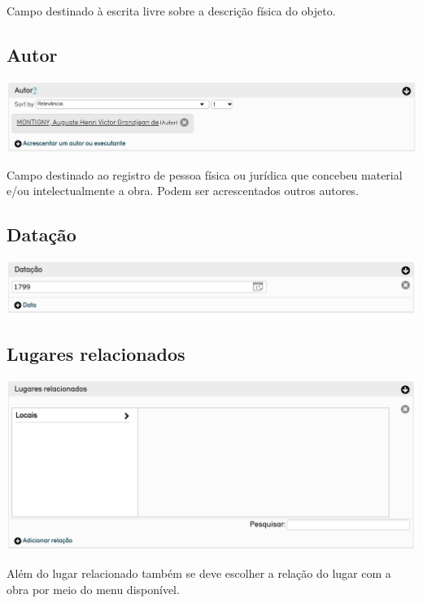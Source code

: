 Campo destinado à escrita livre sobre a descrição física do objeto.

\subsection{Autor}
\begin{flushleft}
	\includegraphics[width=\linewidth]{autor-01}
\end{flushleft}
Campo destinado ao registro de pessoa física ou jurídica que concebeu material e/ou intelectualmente a obra. Podem ser acrescentados outros autores.

\subsection{Datação}
\begin{flushleft}
	\includegraphics[width=\linewidth]{elemento-03}
\end{flushleft}

\subsection{Lugares relacionados}
\begin{flushleft}
	\includegraphics[width=\linewidth]{elemento-04}
\end{flushleft}

Além do lugar relacionado também se deve escolher a relação do lugar com a obra por meio do menu disponível.

